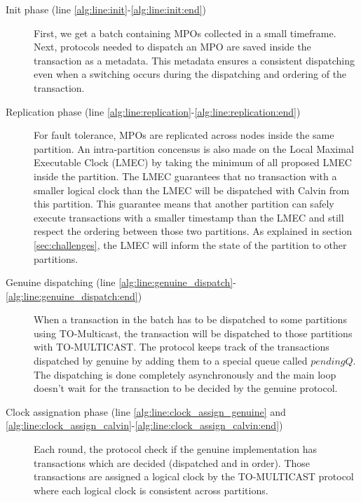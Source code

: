 \documentclass[a4paper, 10pt]{article}
\newcommand{\GE}{TO-Multicast}
\newcommand{\PE}{Calvin}
\begin{document}
\begin{description}
    \item[Init phase (line \ref{alg:line:init}-\ref{alg:line:init:end})] First, we get a batch containing MPOs collected in
        a small timeframe. Next, protocols needed to dispatch an MPO are saved inside the transaction as a metadata.
        This metadata ensures a consistent dispatching even when a switching occurs during the dispatching and ordering
        of the transaction.

    \item[Replication phase (line \ref{alg:line:replication}-\ref{alg:line:replication:end})]
        For fault tolerance, MPOs are replicated across nodes inside the same
        partition. An intra-partition concensus is also made on the Local
        Maximal Executable Clock (LMEC) by taking the minimum of all proposed
        LMEC inside the partition. The LMEC guarantees that no transaction with a
        smaller logical clock than the LMEC will be dispatched with \PE{} from this partition.
        This guarantee means that another partition can safely execute transactions
        with a smaller timestamp than the LMEC and still respect the ordering between those
        two partitions. As explained in section \ref{sec:challenges}, the LMEC will inform
        the state of the partition to other partitions.

    \item[Genuine dispatching (line \ref{alg:line:genuine_dispatch}-\ref{alg:line:genuine_dispatch:end})]
        When a transaction in the batch has to be dispatched to some partitions using \GE, the transaction will be dispatched
        to those partitions with TO-MULTICAST. The protocol keeps track of the transactions dispatched by genuine
        by adding them to a special queue
        called $pendingQ$. The dispatching is done completely asynchronously and the main loop
        doesn't wait for the transaction to be decided by the genuine protocol.

    \item[Clock assignation phase (line \ref{alg:line:clock_assign_genuine} and \ref{alg:line:clock_assign_calvin}-\ref{alg:line:clock_assign_calvin:end})]
        Each round, the protocol check if the genuine implementation has transactions which are decided (dispatched and
        in order). Those transactions are assigned a logical clock by the TO-MULTICAST protocol
        where each logical clock is consistent across partitions.


\end{description}
\end{document}
